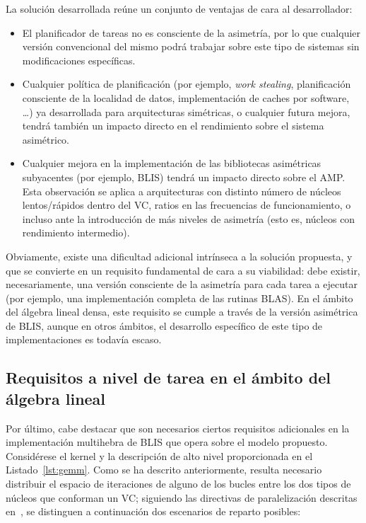 La solución desarrollada reúne un conjunto de ventajas de cara al desarrollador:

\begin{itemize}
\item El planificador de tareas no es consciente de la asimetría, por lo que cualquier versión convencional 
      del mismo podrá trabajar sobre este tipo de sistemas sin modificaciones específicas. 
\item Cualquier política de planificación (por ejemplo, {\em work stealing}, planificación consciente de la localidad de datos,
      implementación de caches por software, \ldots) ya desarrollada para arquitecturas simétricas, o cualquier futura mejora,
      tendrá también un impacto directo en el rendimiento sobre el sistema asimétrico.
\item Cualquier mejora en la implementación de las bibliotecas asimétricas subyacentes (por ejemplo, BLIS) tendrá un impacto directo
      sobre el AMP. Esta observación se aplica a arquitecturas con distinto número de núcleos lentos/rápidos dentro del VC, ratios
      en las frecuencias de funcionamiento, o incluso ante la introducción de más niveles de asimetría (esto es, núcleos con rendimiento
      intermedio).
\end{itemize}

Obviamente, existe una dificultad adicional intrínseca a la solución propuesta, y que se convierte en un requisito fundamental de cara
a su viabilidad: debe existir, necesariamente, una versión consciente de la asimetría para cada tarea a ejecutar (por ejemplo, una implementación
completa de las rutinas BLAS). En el ámbito del álgebra lineal densa, este requisito se cumple a través de la versión asimétrica de BLIS, aunque
en otros ámbitos, el desarrollo específico de este tipo de implementaciones es todavía escaso.

\subsection{Requisitos a nivel de tarea en el ámbito del álgebra lineal}

Por último, cabe destacar que son necesarios ciertos requisitos adicionales
en la implementación multihebra de BLIS que opera sobre el modelo
propuesto. Considérese el kernel \gemm y la descripción de alto nivel
proporcionada en el Listado~\ref{lst:gemm}. Como se ha descrito
anteriormente, resulta necesario distribuir el espacio de iteraciones de
alguno de los bucles entre los dos tipos de núcleos que conforman un VC;
siguiendo las directivas de paralelización descritas en~\cite{BLIS3}, se
distinguen a continuación dos escenarios de reparto posibles:

